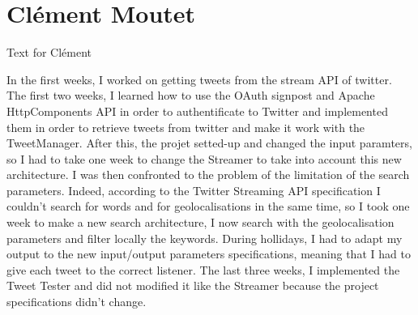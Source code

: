 \section{Cl\'{e}ment Moutet}

Text for Cl\'{e}ment 

In the first weeks, I worked on getting tweets from the stream API of twitter. The first two weeks, I learned how to use the OAuth signpost and Apache HttpComponents API in order to authentificate to Twitter and implemented them in order to retrieve tweets from twitter and make it work with the TweetManager. 
After this, the projet setted-up and changed the input paramters, so I had to take one week to change the Streamer to take into account this new architecture.
I was then confronted to the problem of the limitation of the search parameters. Indeed, according to the Twitter Streaming API specification I couldn't search for words and for geolocalisations in the same time, so I took one week to make a new search architecture, I now search with the geolocalisation parameters and filter locally the keywords. During hollidays, I had to adapt my output to the new input/output parameters specifications, meaning that I had to give each tweet to the correct listener.
The last three weeks, I implemented the Tweet Tester and did not modified it like the Streamer because the project specifications didn't change.
